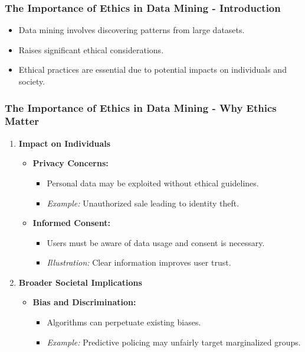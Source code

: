 \documentclass{beamer}
\begin{document}
\begin{frame}[fragile]
    \frametitle{The Importance of Ethics in Data Mining - Introduction}
    \begin{itemize}
        \item Data mining involves discovering patterns from large datasets.
        \item Raises significant ethical considerations.
        \item Ethical practices are essential due to potential impacts on individuals and society.
    \end{itemize}
\end{frame}

\begin{frame}[fragile]
    \frametitle{The Importance of Ethics in Data Mining - Why Ethics Matter}
    \begin{enumerate}
        \item \textbf{Impact on Individuals}
            \begin{itemize}
                \item \textbf{Privacy Concerns:} 
                    \begin{itemize}
                        \item Personal data may be exploited without ethical guidelines.
                        \item \textit{Example:} Unauthorized sale leading to identity theft.
                    \end{itemize}
                    
                \item \textbf{Informed Consent:}
                    \begin{itemize}
                        \item Users must be aware of data usage and consent is necessary.
                        \item \textit{Illustration:} Clear information improves user trust.
                    \end{itemize}
            \end{itemize}
        \item \textbf{Broader Societal Implications}
            \begin{itemize}
                \item \textbf{Bias and Discrimination:}
                    \begin{itemize}
                        \item Algorithms can perpetuate existing biases.
                        \item \textit{Example:} Predictive policing may unfairly target marginalized groups.
                    \end{itemize}
                    

\end{itemize}
\end{enumerate}
\end{frame}
\end{document}
